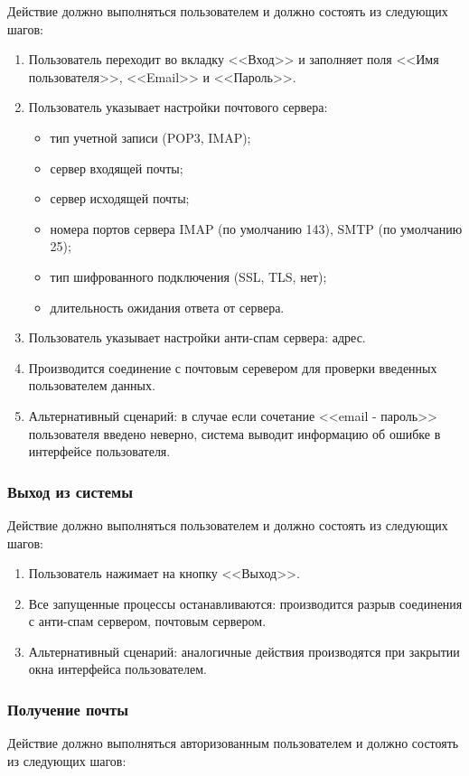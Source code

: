 Действие должно выполняться пользователем и должно состоять из следующих шагов:
\begin{enumerate}
  \item Пользователь переходит во вкладку <<Вход>> и заполняет поля <<Имя пользователя>>, <<Email>> и <<Пароль>>.
  \item Пользователь указывает настройки почтового сервера:
    \begin{itemize}
      \item тип учетной записи (POP3, IMAP);
      \item сервер входящей почты;
      \item сервер исходящей почты;
      \item номера портов сервера IMAP (по умолчанию 143), SMTP (по умолчанию 25);
      \item тип шифрованного подключения (SSL, TLS, нет);
      \item длительность ожидания ответа от сервера.
    \end{itemize}
  \item Пользователь указывает настройки анти-спам сервера: адрес.
  \item Производится соединение с почтовым серевером для проверки введенных пользователем данных.
  \item Альтернативный сценарий: в случае если сочетание <<email - пароль>> пользователя введено неверно, система выводит информацию об ошибке в интерфейсе пользователя.
\end{enumerate}

\subsubsection*{Выход из системы}
Действие должно выполняться пользователем и должно состоять из следующих шагов:
\begin{enumerate}
  \item Пользователь нажимает на кнопку <<Выход>>.
  \item Все запущенные процессы останавливаются: производится разрыв соединения с анти-спам сервером, почтовым сервером.
  \item Альтернативный сценарий: аналогичные действия производятся при закрытии окна интерфейса пользователем.
\end{enumerate}

\subsubsection*{Получение почты}
Действие должно выполняться авторизованным пользователем и должно состоять из следующих шагов:

